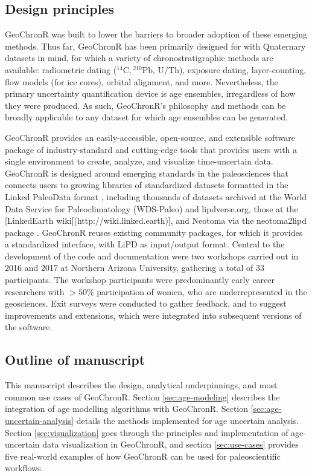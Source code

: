 \documentclass[gchron, manuscript]{copernicus}
\begin{document}
\subsection{Design principles}

GeoChronR was built to lower the barriers to broader adoption of these emerging methods.
Thus far, GeoChronR has been primarily designed for with Quaternary datasets in mind, for which a variety of chronostratigraphic methods are available: radiometric dating (\({}^{14}\mathrm{C}, {}^{210}\mathrm{Pb}\), U/Th), exposure dating, layer-counting, flow models (for ice cores), orbital alignment, and more.
Nevertheless, the primary uncertainty quantification device is age ensembles, irregardless of how they were produced.
As such, GeoChronR's philosophy and methods can be broadly applicable to any dataset for which age ensembles can be generated.

GeoChronR provides an easily-accessible, open-source, and extensible software package of industry-standard and cutting-edge tools that provides users with a single environment to create, analyze, and visualize time-uncertain data.
GeoChronR is designed around emerging standards in the paleosciences that connects users to growing libraries of standardized datasets formatted in the Linked PaleoData format \citep{lipd_cp}, including thousands of datasets archived at the World Data Service for Paleoclimatology (WDS-Paleo) and lipdverse.org, those at the {[}LinkedEarth wiki{[}(http://wiki.linked.earth){]}, and Neotoma \citep{williams2018neotoma} via the neotoma2lipd package \citep{neotoma2lipd}.
GeoChronR reuses existing community packages, for which it provides a standardized interface, with LiPD as input/output format.
Central to the development of the code and documentation were two workshops carried out in 2016 and 2017 at Northern Arizona University, gathering a total of 33 participants.
The workshop participants were predominantly early career researchers with \(>50\%\) participation of women, who are underrepresented in the geosciences.
Exit surveys were conducted to gather feedback, and to suggest improvements and extensions, which were integrated into subsequent versions of the software.

\subsection{Outline of manuscript}

This manuscript describes the design, analytical underpinnings, and most common use cases of GeoChronR.
Section \ref{sec:age-modeling} describes the integration of age modelling algorithms with GeoChronR.
Section \ref{sec:age-uncertain-analysis} details the methods implemented for age uncertain analysis.
Section \ref{sec:visualization} goes through the principles and implementation of age-uncertain data visualization in GeoChronR, and section \ref{sec:use-cases} provides five real-world examples of how GeoChronR can be used for paleoscientific workflows.
\end{document}
